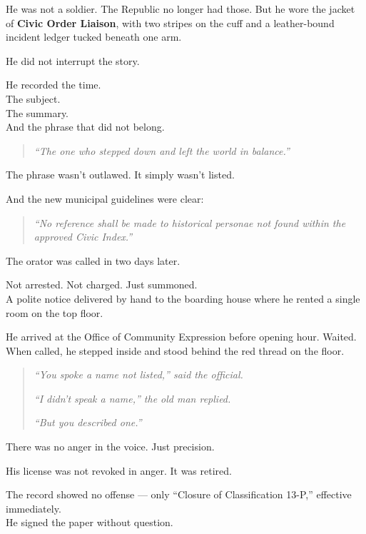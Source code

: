 \documentclass[12pt]{article}
\begin{document}
He was not a soldier. The Republic no longer had those. But he wore the jacket of \textbf{Civic Order Liaison}, with two stripes on the cuff and a leather-bound incident ledger tucked beneath one arm.

He did not interrupt the story.

He recorded the time.\\
The subject.\\
The summary.\\
And the phrase that did not belong.

\begin{quote}
\textit{“The one who stepped down and left the world in balance.”}
\end{quote}

The phrase wasn’t outlawed. It simply wasn’t listed.

And the new municipal guidelines were clear:

\begin{quote}
\textit{“No reference shall be made to historical personae not found within the approved Civic Index.”}
\end{quote}

\vspace{1em}

The orator was called in two days later.

Not arrested. Not charged. Just summoned.\\
A polite notice delivered by hand to the boarding house where he rented a single room on the top floor.

He arrived at the Office of Community Expression before opening hour. Waited. When called, he stepped inside and stood behind the red thread on the floor.

\begin{quote}
\textit{“You spoke a name not listed,” said the official.}

\textit{“I didn’t speak a name,” the old man replied.}

\textit{“But you described one.”}
\end{quote}

There was no anger in the voice. Just precision.

\vspace{1em}

His license was not revoked in anger. It was retired.

The record showed no offense --- only ``Closure of Classification 13-P,'' effective immediately.\\
He signed the paper without question.
\end{document}
